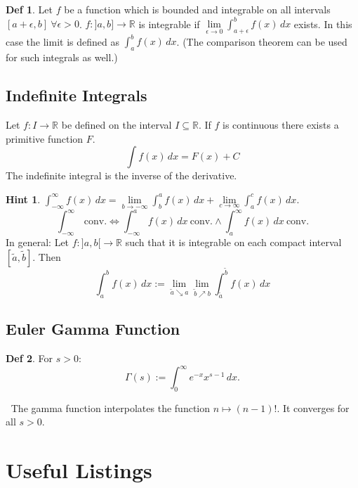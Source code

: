\documentclass[a4paper, 10pt]{article}
\theoremstyle{definition}
\newtheorem*{definition}{Def}
\newtheorem*{note_wrapper}{Hint}
\theoremstyle{named}
\newenvironment{note}%
    {\begin{mdframed}[style=trick]\begin{note_wrapper}}%
    {\end{note_wrapper}\end{mdframed}}
\newcommand{\R}{\mathbb{R}}
\begin{document}
\begin{definition}
    Let $f$ be a function which is bounded and integrable on all intervals $[a + \epsilon, b] \ \forall \epsilon > 0$. $f: ]a, b] \to \R$ is integrable if $\lim\limits_{\epsilon \to 0} \int_{a + \epsilon}^b f(x) \,dx$ exists. In this case the limit is defined as $\int_a^b f(x) \,dx$. (The comparison theorem can be used for such integrals as well.)
\end{definition}

\subsection{Indefinite Integrals}
Let $f: I \to \R$ be defined on the interval $I \subseteq \R$. If $f$ is continuous there exists a primitive function $F$.
$$\int f(x) \,dx = F(x) + C$$
The indefinite integral is the inverse of the derivative.

\begin{note}
    $\int_{-\infty}^\infty f(x) \,dx = \lim\limits_{b \to - \infty} \int_b^a f(x) \,dx + \lim\limits_{c \to \infty} \int_a^c f(x) \,dx$.
    $$\int_{-\infty}^\infty \ \text{conv.} \iff \int_{-\infty}^a f(x) \,dx \ \text{conv.} \land \int_a^\infty f(x) \,dx \ \text{conv.}$$
    In general: Let $f: ]a, b[ \to \R$ such that it is integrable on each compact interval $[\tilde{a}, \tilde{b}]$. Then 
    $$\int_a^b f(x) \,dx := \lim\limits_{\tilde{a} \searrow a}\lim\limits_{\tilde{b} \nearrow b} \int_{\tilde{a}}^{\tilde{b}} f(x) \,dx$$
\end{note}

\subsection{Euler Gamma Function}
\begin{definition}
    For $s > 0$:
    $$\Gamma(s) := \int_0^\infty e^{-x}x^{s - 1} \,dx.$$
\end{definition}
$\ $ \newline The gamma function interpolates the function $n \mapsto (n-1)!$. It converges for all $s > 0$.
\pagebreak

\section*{Useful Listings}
\end{document}
